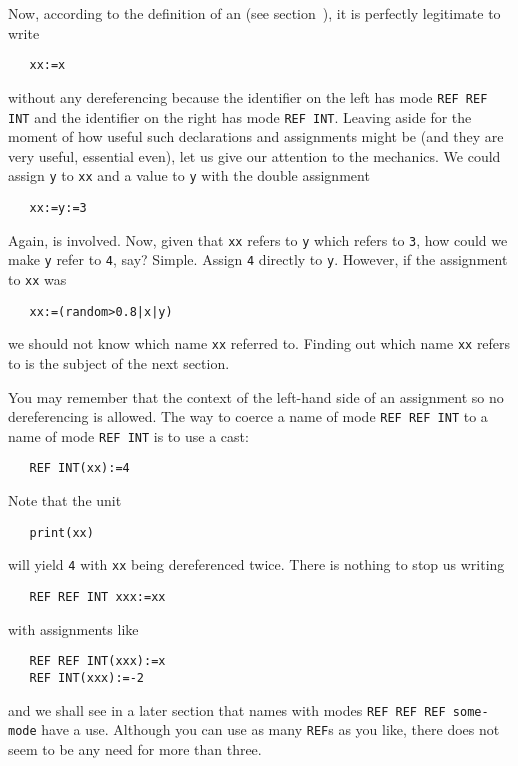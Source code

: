 Now, according to the definition of an 
(see section~), it is perfectly legitimate to write
\begin{verbatim}
   xx:=x
\end{verbatim}
\noindent
without any dereferencing because the identifier on the left has mode
\verb|REF REF INT| and the identifier on the right has mode
\verb|REF INT|.  Leaving aside for the moment of how useful such
declarations and assignments might be (and they are very useful,
essential even), let us give our attention to the mechanics. We could
assign \verb|y| to \verb|xx| and a value to \verb|y| with the double
assignment
\begin{verbatim}
   xx:=y:=3
\end{verbatim}
\noindent
Again,  is involved.
Now, given that \verb|xx| refers to \verb|y| which refers to
\verb|3|, how could we make \verb|y| refer to \verb|4|, say? Simple.
Assign \verb|4| directly to \verb|y|. However, if the assignment to
\verb|xx| was
\begin{verbatim}
   xx:=(random>0.8|x|y)
\end{verbatim}
\noindent
we should not know which name \verb|xx| referred to. Finding out which
name \verb|xx| refers to is the subject of the next section.

You may remember that the context of the left-hand side of an
assignment  so no dereferencing is
allowed. The way to coerce a name of mode \verb|REF REF INT| to a
name of mode \verb|REF INT| is to use a cast:
\begin{verbatim}
   REF INT(xx):=4
\end{verbatim}
\noindent
Note that the unit
\begin{verbatim}
   print(xx)
\end{verbatim}
\noindent
will yield \verb|4| with \verb|xx| being dereferenced twice. There is
nothing to stop us writing
\begin{verbatim}
   REF REF INT xxx:=xx
\end{verbatim}
\noindent
with assignments like
\begin{verbatim}
   REF REF INT(xxx):=x
   REF INT(xxx):=-2
\end{verbatim}
\noindent
and we shall see in a later section that names with modes
\verb|REF REF REF some-mode| have a use. Although you can use as many
\verb|REF|s as you like, there does not seem to be any need for more
than three.

